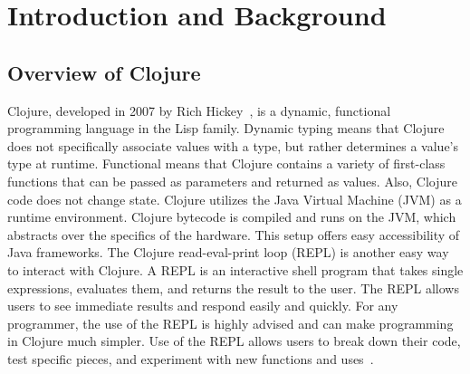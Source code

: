 \documentclass[12pt]{article}
\newcommand{\comment}[1]{{\bf \tt  {#1}}}
\newcommand{\emcomment}[1]{\textcolor{ForestGreen}{\comment{Elena: {#1}}}}
\newcommand{\hfcomment}[1]{\textcolor{Teal}{\comment{Henry: {#1}}}}
\begin{document}
\section{Introduction and Background}\label{sec:intro}
\subsection{Overview of Clojure}\label{sec:clojure}
  
  
Clojure, developed in 2007 by Rich Hickey~\cite{Hickey:2008}, is a dynamic, functional
programming language in the Lisp family. Dynamic typing means that Clojure does not specifically
associate
values with a type, but rather determines a value's type at runtime. Functional means
that Clojure contains a variety of first-class functions that can be passed as parameters and returned
as values. Also, Clojure code does not change state.
Clojure utilizes the Java Virtual Machine (JVM) as a runtime environment. Clojure bytecode is compiled
and runs on the JVM, which abstracts over the specifics of the hardware.
This setup offers easy 
accessibility of Java frameworks. The Clojure read-eval-print loop (REPL)
is another easy way to interact 
 with Clojure. A REPL is an interactive shell program that takes single 
expressions, evaluates them, and returns the result to the user. The REPL allows users to see 
immediate results and respond easily and quickly. For any programmer, the use of the REPL 
is highly advised and can make programming in Clojure much simpler. Use of the REPL allows users
to break down their code, test specific pieces, and experiment with new functions and uses~\cite{clojure-REPL}.
\end{document}
